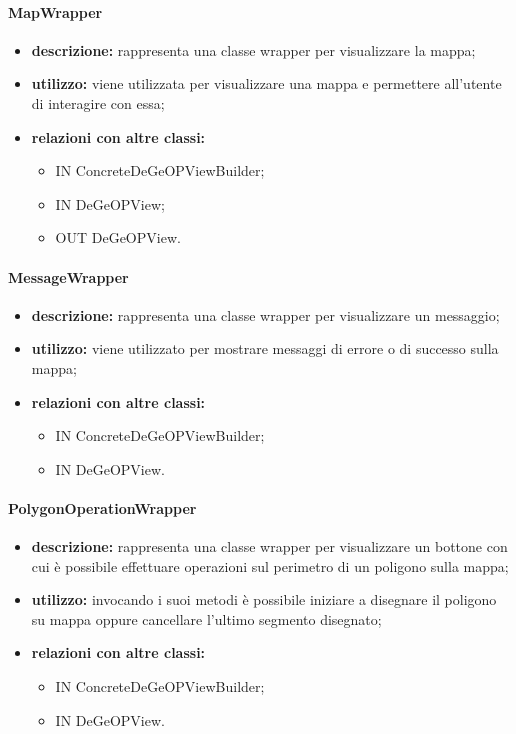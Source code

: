 \paragraph{MapWrapper}
\begin{itemize}
	\item \textbf{descrizione:} rappresenta una classe wrapper per visualizzare la mappa;
	\item \textbf{utilizzo:} viene utilizzata per visualizzare una mappa e permettere all'utente di interagire con essa;
	\item \textbf{relazioni con altre classi:} 
	\begin{itemize}
		\item IN ConcreteDeGeOPViewBuilder;
		\item IN DeGeOPView;
		\item OUT DeGeOPView.
	\end{itemize}
\end{itemize}
\paragraph{MessageWrapper}
\begin{itemize}
	\item \textbf{descrizione:} rappresenta una classe wrapper per visualizzare un messaggio;
	\item \textbf{utilizzo:} viene utilizzato per mostrare messaggi di errore o di successo sulla mappa;
	\item \textbf{relazioni con altre classi:} 
	\begin{itemize}
		\item IN ConcreteDeGeOPViewBuilder;
		\item IN DeGeOPView.
	\end{itemize}
\end{itemize}
\paragraph{PolygonOperationWrapper}
\begin{itemize}
	\item \textbf{descrizione:} rappresenta una classe wrapper per visualizzare un bottone con cui è possibile effettuare operazioni sul perimetro di un poligono sulla mappa;
	\item \textbf{utilizzo:} invocando i suoi metodi è possibile iniziare a disegnare il poligono su mappa oppure cancellare l'ultimo segmento disegnato;
	\item \textbf{relazioni con altre classi:} 
	\begin{itemize}
		\item IN ConcreteDeGeOPViewBuilder;
		\item IN DeGeOPView.
	\end{itemize}
\end{itemize}
\newpage
